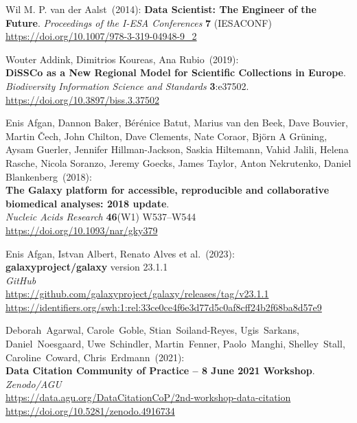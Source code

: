 
\makeatletter
{}

\begin{thebibliography}{9}

\small

Wil M. P. van der Aalst~(2014):
\textbf{Data Scientist: The Engineer of the Future}.
\emph{Proceedings of the I-ESA Conferences} \textbf{7} (IESACONF) \\
\url{https://doi.org/10.1007/978-3-319-04948-9_2}

Wouter Addink, Dimitrios Koureas, Ana Rubio~(2019): \\
\textbf{DiSSCo as a New Regional Model for Scientific Collections in Europe}.\\
\emph{Biodiversity Information Science and Standards}
\textbf{3}:e37502.\\
\url{https://doi.org/10.3897/biss.3.37502}

Enis Afgan, Dannon Baker, Bérénice Batut, Marius van
den Beek, Dave Bouvier, Martin Čech, John Chilton, Dave Clements, Nate
Coraor, Björn A Grüning, Aysam Guerler, Jennifer Hillman-Jackson, Saskia
Hiltemann, Vahid Jalili, Helena Rasche, Nicola Soranzo, Jeremy Goecks,
James Taylor, Anton Nekrutenko, Daniel Blankenberg~(2018): \\
\textbf{The Galaxy platform for accessible, reproducible and
collaborative biomedical analyses: 2018 update}.\\
\emph{Nucleic Acids Research} \textbf{46}(W1) W537--W544\\
\url{https://doi.org/10.1093/nar/gky379}

Enis Afgan, Istvan Albert, Renato Alves et al.~(2023): \\
\textbf{galaxyproject/galaxy} version 23.1.1\\
\emph{GitHub}\\
\url{https://github.com/galaxyproject/galaxy/releases/tag/v23.1.1}\\
\url{https://identifiers.org/swh:1:rel:33ce0ce4f6e3d77d5c0af8cff24b2f68ba8d57e9}

Deborah~Agarwal, Carole~Goble, Stian~Soiland-Reyes,
Ugis~Sarkans, Daniel~Noesgaard, Uwe~Schindler, Martin~Fenner,
Paolo~Manghi, Shelley~Stall, Caroline~Coward, Chris~Erdmann~(2021): \\
\textbf{Data Citation Community of Practice -- 8 June 2021 Workshop}.\\
\emph{Zenodo/AGU}\\
\url{https://data.agu.org/DataCitationCoP/2nd-workshop-data-citation}\\
\url{https://doi.org/10.5281/zenodo.4916734}


\end{thebibliography}
